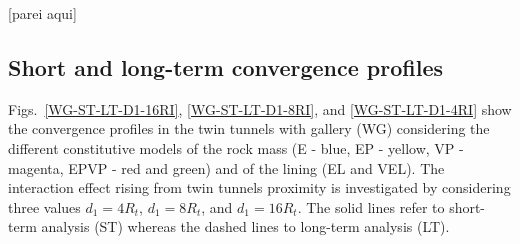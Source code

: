 \documentclass[a4paper,fleqn]{cas-sc}
\begin{document}
[parei aqui]


\subsection{Short and long-term convergence profiles}\label{}

Figs.~\ref{WG-ST-LT-D1-16RI}, \ref{WG-ST-LT-D1-8RI}, and \ref{WG-ST-LT-D1-4RI} show the convergence profiles in the twin tunnels with gallery (WG) considering the different constitutive models of the rock mass (E - blue, EP - yellow, VP - magenta, EPVP - red and green) and of the lining (EL and VEL). The interaction effect rising from twin tunnels proximity is investigated by considering three values $d_1=4R_t$, $d_1=8R_t$, and $d_1=16R_t$.  The solid lines refer to short-term analysis (ST) whereas the dashed lines to long-term analysis (LT).
\end{document}
